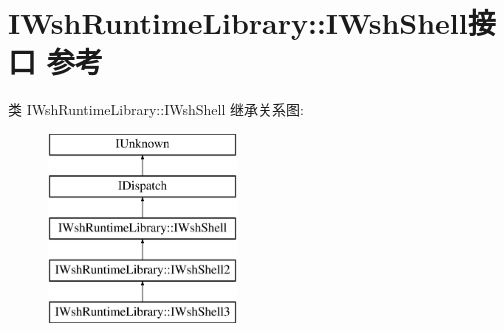 \hypertarget{interface_i_wsh_runtime_library_1_1_i_wsh_shell}{}\section{I\+Wsh\+Runtime\+Library\+:\+:I\+Wsh\+Shell接口 参考}
\label{interface_i_wsh_runtime_library_1_1_i_wsh_shell}
类 I\+Wsh\+Runtime\+Library\+:\+:I\+Wsh\+Shell 继承关系图\+:\begin{figure}[H]
\begin{center}
\leavevmode
\includegraphics[height=5.000000cm]{interface_i_wsh_runtime_library_1_1_i_wsh_shell}
\end{center}
\end{figure}
